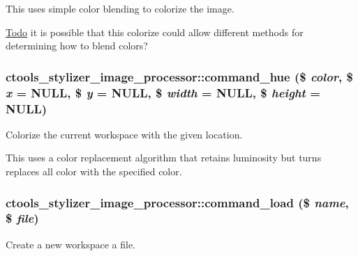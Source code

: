 This uses simple color blending to colorize the image.

\begin{Desc}
\item[\hyperlink{todo__todo000007}{Todo}]it is possible that this colorize could allow different methods for determining how to blend colors? \end{Desc}
\hypertarget{classctools__stylizer__image__processor_afd565f19f356b713eb24cd0248353ea2}{
\subsubsection[{command\_\-hue}]{\setlength{\rightskip}{0pt plus 5cm}ctools\_\-stylizer\_\-image\_\-processor::command\_\-hue (\$ {\em color}, \/  \$ {\em x} = {\ttfamily NULL}, \/  \$ {\em y} = {\ttfamily NULL}, \/  \$ {\em width} = {\ttfamily NULL}, \/  \$ {\em height} = {\ttfamily NULL})}}
\label{classctools__stylizer__image__processor_afd565f19f356b713eb24cd0248353ea2}
Colorize the current workspace with the given location.

This uses a color replacement algorithm that retains luminosity but turns replaces all color with the specified color. \hypertarget{classctools__stylizer__image__processor_ac609fbaeff7f515d601195936f7e57d2}{
\subsubsection[{command\_\-load}]{\setlength{\rightskip}{0pt plus 5cm}ctools\_\-stylizer\_\-image\_\-processor::command\_\-load (\$ {\em name}, \/  \$ {\em file})}}
\label{classctools__stylizer__image__processor_ac609fbaeff7f515d601195936f7e57d2}
Create a new workspace a file.

